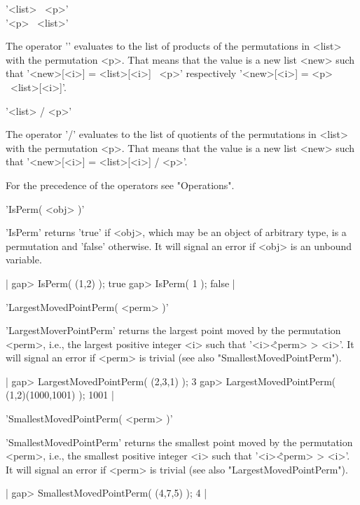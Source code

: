 '<list> \*\ <p>' \\
'<p> \*\ <list>'

The operator '\*' evaluates  to the  list of products of the permutations
in <list> with  the permutation <p>.  That  means that the value is a new
list <new>  such that  '<new>[<i>] = <list>[<i>]  \*\  <p>'  respectively
'<new>[<i>] = <p> \*\ <list>[<i>]'.

'<list> / <p>'

The operator '/' evaluates to the list  of  quotients of the permutations
in <list> with  the permutation  <p>.  That means that the value is a new
list <new> such that '<new>[<i>] = <list>[<i>] / <p>'.

For the precedence of the operators see "Operations".


'IsPerm( <obj> )'

'IsPerm' returns 'true'  if  <obj>, which may be  an  object of arbitrary
type, is a permutation and 'false' otherwise.  It will signal an error if
<obj> is an unbound variable.

|    gap> IsPerm( (1,2) );
    true
    gap> IsPerm( 1 );
    false |


'LargestMovedPointPerm( <perm> )'

'LargestMoverPointPerm'   returns  the   largest  point   moved   by  the
permutation  <perm>, i.e.,  the  largest  positive  integer <i> such that
'<i>\^<perm>  \<>  <i>'.   It will  signal an error  if <perm> is trivial
(see also "SmallestMovedPointPerm").

|    gap> LargestMovedPointPerm( (2,3,1) );
    3
    gap> LargestMovedPointPerm( (1,2)(1000,1001) );
    1001 |


'SmallestMovedPointPerm( <perm> )'

'SmallestMovedPointPerm'  returns  the  smallest   point  moved  by   the
permutation <perm>,  i.e., the  smallest  positive integer  <i> such that
'<i>\^<perm> \<>  <i>'.   It will signal  an error if  <perm>  is trivial
(see also "LargestMovedPointPerm").

|    gap> SmallestMovedPointPerm( (4,7,5) );
    4 |

